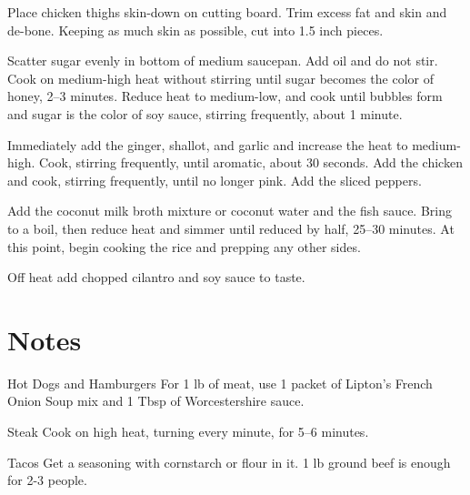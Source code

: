\documentclass[oneside]{book}  %
\def\thisrecipe{}  %
\newcommand{\recipe}[1]{\section{#1}\def\thisrecipe{: #1}} %
\begin{document}
\begin{directions}
  \item Place chicken thighs skin-down on cutting board. Trim excess fat and
    skin and de-bone. Keeping as much skin as possible, cut into 1.5 inch
    pieces.

  \item Scatter sugar evenly in bottom of medium saucepan. Add oil and do not
    stir. Cook on medium-high heat without stirring until sugar becomes the
    color of honey, 2--3 minutes. Reduce heat to medium-low, and cook until
    bubbles form and sugar is the color of soy sauce, stirring frequently, about
    1 minute.

  \item Immediately add the ginger, shallot, and garlic and increase the heat to
    medium-high. Cook, stirring frequently, until aromatic, about 30 seconds.
    Add the chicken and cook, stirring frequently, until no longer pink. Add the
    sliced peppers.

  \item Add the coconut milk broth mixture or coconut water and the fish sauce.
    Bring to a boil, then reduce heat and simmer until reduced by half, 25--30
    minutes. At this point, begin cooking the rice and prepping any other sides.

  \item Off heat add chopped cilantro and soy sauce to taste.
\end{directions}
\recipe{Notes} \label{notes:dinners_standalone} %
\begin{kitchennotes}
  \item[Hot Dogs and Hamburgers]  
    For 1 lb of meat, use 1 packet of Lipton's French Onion Soup mix and 1 Tbsp
    of Worcestershire sauce.
  \item[Steak]  
    Cook on high heat, turning every minute, for 5--6 minutes.
  \item[Tacos]  
    Get a seasoning with cornstarch or flour in it. 1 lb ground beef is enough
    for 2-3 people.
\end{kitchennotes}
\end{document}
